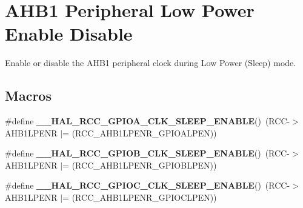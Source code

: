 \hypertarget{group___r_c_c___a_h_b1___low_power___enable___disable}{}\section{A\+H\+B1 Peripheral Low Power Enable Disable}
\label{group___r_c_c___a_h_b1___low_power___enable___disable}


Enable or disable the A\+H\+B1 peripheral clock during Low Power (Sleep) mode.  


\subsection*{Macros}
\begin{DoxyCompactItemize}
\item 
\mbox{\label{group___r_c_c___a_h_b1___low_power___enable___disable_gaff8820b47bd3764e7cded76b9368460b}} 
\#define {\bfseries \+\_\+\+\_\+\+H\+A\+L\+\_\+\+R\+C\+C\+\_\+\+G\+P\+I\+O\+A\+\_\+\+C\+L\+K\+\_\+\+S\+L\+E\+E\+P\+\_\+\+E\+N\+A\+B\+LE}()~(R\+CC-\/$>$A\+H\+B1\+L\+P\+E\+NR $\vert$= (R\+C\+C\+\_\+\+A\+H\+B1\+L\+P\+E\+N\+R\+\_\+\+G\+P\+I\+O\+A\+L\+P\+EN))
\item 
\mbox{\label{group___r_c_c___a_h_b1___low_power___enable___disable_ga0e718efc965ab07752cd865c3f33551a}} 
\#define {\bfseries \+\_\+\+\_\+\+H\+A\+L\+\_\+\+R\+C\+C\+\_\+\+G\+P\+I\+O\+B\+\_\+\+C\+L\+K\+\_\+\+S\+L\+E\+E\+P\+\_\+\+E\+N\+A\+B\+LE}()~(R\+CC-\/$>$A\+H\+B1\+L\+P\+E\+NR $\vert$= (R\+C\+C\+\_\+\+A\+H\+B1\+L\+P\+E\+N\+R\+\_\+\+G\+P\+I\+O\+B\+L\+P\+EN))
\item 
\mbox{\label{group___r_c_c___a_h_b1___low_power___enable___disable_gac62505cc695d985fcf18ca1fd2f1a421}} 
\#define {\bfseries \+\_\+\+\_\+\+H\+A\+L\+\_\+\+R\+C\+C\+\_\+\+G\+P\+I\+O\+C\+\_\+\+C\+L\+K\+\_\+\+S\+L\+E\+E\+P\+\_\+\+E\+N\+A\+B\+LE}()~(R\+CC-\/$>$A\+H\+B1\+L\+P\+E\+NR $\vert$= (R\+C\+C\+\_\+\+A\+H\+B1\+L\+P\+E\+N\+R\+\_\+\+G\+P\+I\+O\+C\+L\+P\+EN))
\item 
\mbox{\label{group___r_c_c___a_h_b1___low_power___enable___disable_ga3e9419b44e83ed1e6951801c390a69ad}} 

\end{DoxyCompactItemize}
